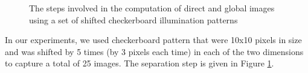 \begin{figure}[t]
\centering
{}
\caption{The steps involved in the computation of direct and
global images using a set of shifted checkerboard illumination patterns}\label{fig:16}
\end{figure}





In our experiments, we used checkerboard pattern that were 10x10 pixels in
size and was shifted by 5 times (by 3 pixels each time) in each of
the two dimensions to capture a total of 25 images. The separation
step is given in Figure \ref{fig:16}.

